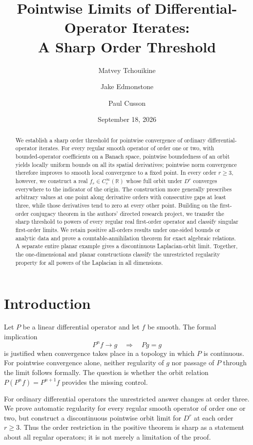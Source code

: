 \documentclass[11pt,reqno]{amsart}
\title[Pointwise limits and a sharp order threshold]{Pointwise Limits of Differential-Operator Iterates:\\A Sharp Order Threshold}
\author{Matvey Tchouikine}
\author{Jake Edmonstone}
\author{Paul Cusson}
\date{September 18, 2026}
\numberwithin{equation}{section}
\theoremstyle{definition}
\theoremstyle{remark}
\newcommand{\R}{\mathbb R}
\begin{document}
\begin{abstract}
We establish a sharp order threshold for pointwise convergence of ordinary differential-operator iterates. For every regular smooth operator of order one or two, with bounded-operator coefficients on a Banach space, pointwise boundedness of an orbit yields locally uniform bounds on all its spatial derivatives; pointwise norm convergence therefore improves to smooth local convergence to a fixed point. In every order $r\ge3$, however, we construct a real $f_r\in C_c^\infty(\R)$ whose full orbit under $D^r$ converges everywhere to the indicator of the origin. The construction more generally prescribes arbitrary values at one point along derivative orders with consecutive gaps at least three, while those derivatives tend to zero at every other point. Building on the first-order conjugacy theorem in the authors' directed research project, we transfer the sharp threshold to powers of every regular real first-order operator and classify singular first-order limits. We retain positive all-orders results under one-sided bounds or analytic data and prove a countable-annihilation theorem for exact algebraic relations. A separate entire planar example gives a discontinuous Laplacian-orbit limit. Together, the one-dimensional and planar constructions classify the unrestricted regularity property for all powers of the Laplacian in all dimensions.
\end{abstract}
\maketitle

\section{Introduction}
Let $P$ be a linear differential operator and let $f$ be smooth. The formal implication
\begin{equation}\label{eq:formal}
 P^nf\longrightarrow g \quad\Longrightarrow\quad Pg=g
\end{equation}
is justified when convergence takes place in a topology in which $P$ is continuous. For pointwise convergence alone, neither regularity of $g$ nor passage of $P$ through the limit follows formally. The question is whether the orbit relation $P(P^nf)=P^{n+1}f$ provides the missing control.

For ordinary differential operators the unrestricted answer changes at order three. We prove automatic regularity for every regular smooth operator of order one or two, but construct a discontinuous pointwise orbit limit for $D^r$ at each order $r\ge3$. Thus the order restriction in the positive theorem is sharp as a statement about all regular operators; it is not merely a limitation of the proof.
\end{document}
